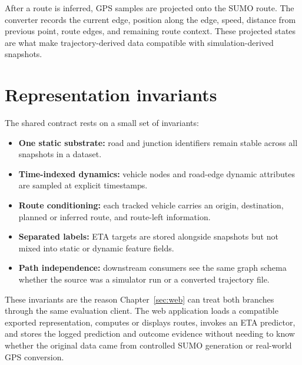 

After a route is inferred, GPS samples are projected onto the SUMO route. The converter records the current edge, position along the edge, speed, distance from previous point, route edges, and remaining route context. These projected states are what make trajectory-derived data compatible with simulation-derived snapshots.

\FloatBarrier

\section{Representation invariants}
The shared contract rests on a small set of invariants:
\begin{itemize}
    \item \textbf{One static substrate:} road and junction identifiers remain stable across all snapshots in a dataset.
    \item \textbf{Time-indexed dynamics:} vehicle nodes and road-edge dynamic attributes are sampled at explicit timestamps.
    \item \textbf{Route conditioning:} each tracked vehicle carries an origin, destination, planned or inferred route, and route-left information.
    \item \textbf{Separated labels:} ETA targets are stored alongside snapshots but not mixed into static or dynamic feature fields.
    \item \textbf{Path independence:} downstream consumers see the same graph schema whether the source was a simulator run or a converted trajectory file.
\end{itemize}

These invariants are the reason Chapter~\ref{sec:web} can treat both branches through the same evaluation client. The web application loads a compatible exported representation, computes or displays routes, invokes an ETA predictor, and stores the logged prediction and outcome evidence without needing to know whether the original data came from controlled SUMO generation or real-world GPS conversion.
